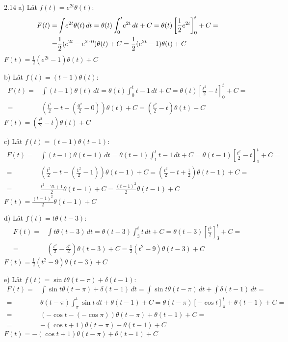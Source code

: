 \begin{task}{2.14 a)}
	Låt $f(t)=e^{2t}\theta(t)$:
	\begin{align*}
	F(t)=
	&\int \! e^{2t}\theta(t) \, dt=
	\theta(t)\int_{0}^{t} \! e^{2t} \, dt+C=
	\theta(t)\left[\frac{1}{2}e^{2t}\right]_{0}^{t}+C= \\ =
	&\frac{1}{2}(e^{2t}-e^{2\operatorname{\cdot}0})\theta(t)+C=
	\frac{1}{2}(e^{2t}-1)\theta(t)+C
	\end{align*}
	\ans $F(t)=\frac{1}{2}(e^{2t}-1)\theta(t)+C$
\end{task}

\begin{task}{b)}
	Låt $f(t)=(t-1)\theta(t)$:
	\begin{align*}
	F(t)=
	&\int \! (t-1)\theta(t) \, dt=
	\theta(t)\int_{0}^{t} \! t-1 \, dt+C=
	\theta(t)\left[\frac{t^2}{2}-t\right]_{0}^{t}+C= \\ =
	&\left(\frac{t^2}{2}-t-\left(\frac{0^2}{2}-0\right)\right)\theta(t)+C=
	\left(\frac{t^2}{2}-t\right)\theta(t)+C
	\end{align*}
	\ans $F(t)=(\frac{t^2}{2}-t)\theta(t)+C$
\end{task}

\begin{task}{c)}
	Låt $f(t)=(t-1)\theta(t-1)$:
	\begin{align*}
	F(t)=
	&\int \! (t-1)\theta(t-1) \, dt=
	\theta(t-1)\int_{1}^{t} \! t-1 \, dt+C=
	\theta(t-1)\left[\frac{t^2}{2}-t\right]_{1}^{t}+C= \\ =
	&\left(\frac{t^2}{2}-t-\left(\frac{1^2}{2}-1\right)\right)\theta(t-1)+C=
	\left(\frac{t^2}{2}-t+\frac{1}{2}\right)\theta(t-1)+C= \\ =
	&\frac{t^2-2t+1}{2}\theta(t-1)+C=
	\frac{(t-1)^2}{2}\theta(t-1)+C
	\end{align*}
	\ans $F(t)=\frac{(t-1)^2}{2}\theta(t-1)+C$
\end{task}

\begin{task}{d)}
	Låt $f(t)=t\theta(t-3)$:
	\begin{align*}
	F(t)=
	&\int \! t\theta(t-3) \, dt=
	\theta(t-3)\int_{3}^{t} \! t \, dt+C=
	\theta(t-3)\left[\frac{t^2}{2}\right]_{3}^{t}+C= \\ =
	&\left(\frac{t^2}{2}-\frac{3^2}{2}\right)\theta(t-3)+C=
	\frac{1}{2}\left(t^2-9\right)\theta(t-3)+C
	\end{align*}
	\ans $F(t)=\frac{1}{2}\left(t^2-9\right)\theta(t-3)+C$
\end{task}

\begin{task}{e)}
	Låt $f(t)=\sin t\theta(t-\pi)+\delta(t-1)$:
	\begin{align*}
	F(t)=
	&\int \! \sin t\theta(t-\pi)+\delta(t-1) \, dt=
	\int \! \sin t\theta(t-\pi) \, dt + \int \! \delta(t-1) \, dt= \\ =
	&\theta(t-\pi)\int_{\pi}^{t} \! \sin t \, dt+\theta(t-1)+C=
	\theta(t-\pi)\left[-\cos t\right]_{\pi}^{t}+\theta(t-1)+C= \\ =
	&\left(-\cos t-(-\cos \pi)\right)\theta(t-\pi)+\theta(t-1)+C= \\ =
	&-\left(\cos t+1\right)\theta(t-\pi)+\theta(t-1)+C
	\end{align*}
	\ans $F(t)=-\left(\cos t+1\right)\theta(t-\pi)+\theta(t-1)+C$
\end{task}
